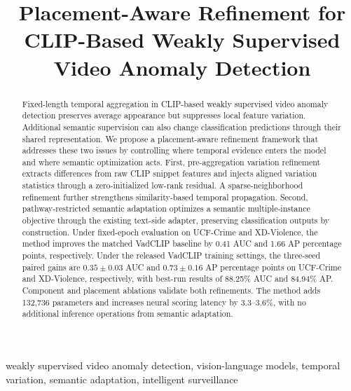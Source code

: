 \documentclass[conference,letterpaper]{IEEEtran}
\begin{document}
\title{Placement-Aware Refinement for CLIP-Based Weakly Supervised Video Anomaly Detection}
\author{}
\maketitle
\begin{abstract}
Fixed-length temporal aggregation in CLIP-based weakly supervised video anomaly detection preserves average appearance but suppresses local feature variation. Additional semantic supervision can also change classification predictions through their shared representation. We propose a placement-aware refinement framework that addresses these two issues by controlling where temporal evidence enters the model and where semantic optimization acts. First, pre-aggregation variation refinement extracts differences from raw CLIP snippet features and injects aligned variation statistics through a zero-initialized low-rank residual. A sparse-neighborhood refinement further strengthens similarity-based temporal propagation. Second, pathway-restricted semantic adaptation optimizes a semantic multiple-instance objective through the existing text-side adapter, preserving classification outputs by construction. Under fixed-epoch evaluation on UCF-Crime and XD-Violence, the method improves the matched VadCLIP baseline by 0.41 AUC and 1.66 AP percentage points, respectively. Under the released VadCLIP training settings, the three-seed paired gains are $0.35\pm0.03$ AUC and $0.73\pm0.16$ AP percentage points on UCF-Crime and XD-Violence, respectively, with best-run results of 88.25\% AUC and 84.94\% AP. Component and placement ablations validate both refinements. The method adds 132,736 parameters and increases neural scoring latency by 3.3--3.6\%, with no additional inference operations from semantic adaptation.
\end{abstract}
\begin{IEEEkeywords}
weakly supervised video anomaly detection, vision-language models, temporal variation, semantic adaptation, intelligent surveillance
\end{IEEEkeywords}





\balance


\end{document}

